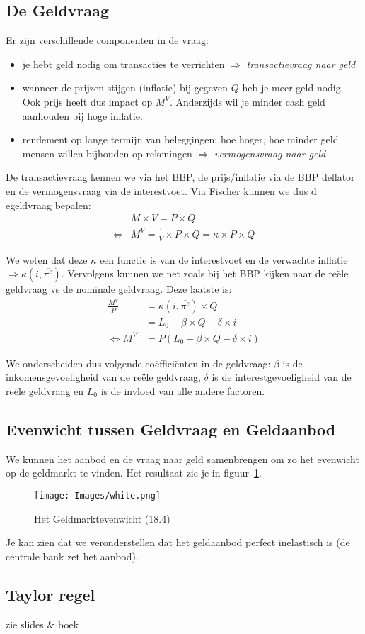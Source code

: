 \subsection{De Geldvraag}
\label{sub:De Geldvraag}
Er zijn verschillende componenten in de vraag:
\begin{itemize}
  \item je hebt geld nodig om transacties te verrichten $\Rightarrow$ \textit{transactievraag naar geld}
  \item wanneer de prijzen stijgen (inflatie) bij gegeven $Q$ heb je meer geld nodig. Ook prijs heeft dus impact op $M^V$. Anderzijds wil je minder cash geld aanhouden bij hoge inflatie.
  \item rendement op lange termijn van beleggingen: hoe hoger, hoe minder geld mensen willen bijhouden op rekeningen $\Rightarrow$ \textit{vermogensvraag naar geld}
\end{itemize}

De transactievraag kennen we via het BBP, de prijs/inflatie via de BBP deflator en de vermogensvraag via de interestvoet. Via Fischer kunnen we dus d egeldvraag bepalen:
\begin{align}
  &M \times V = P \times Q \\
  \Leftrightarrow &M^V = \frac{1}{V} \times P \times Q = \kappa \times P \times Q
\end{align}

We weten dat deze $\kappa$ een functie is van de interestvoet en de verwachte inflatie $\Rightarrow \kappa(\overline{i}, \overline{\pi^e})$. Vervolgens kunnen we net zoals bij het BBP kijken naar de re\"ele geldvraag vs de nominale geldvraag. Deze laatste is:
\begin{align}
  \frac{M^V}{P} &= \kappa(\overline{i}, \overline{\pi^e}) \times Q \\
  &= L_0 + \beta \times Q - \delta \times i \\
  \Leftrightarrow M^V &= P (L_0 + \beta \times Q - \delta \times i)
\end{align}

We onderscheiden dus volgende co\"effici\"enten in de geldvraag: $\beta$ is de inkomensgevoeligheid van de re\"ele geldvraag, $\delta$ is de interestgevoeligheid van de re\"ele geldvraag en $L_0$ is de invloed van alle andere factoren.

\subsection{Evenwicht tussen Geldvraag en Geldaanbod}
\label{sub:Evenwicht tussen Geldvraag en Geldaanbod}
We kunnen het aanbod en de vraag naar geld samenbrengen om zo het evenwicht op de geldmarkt te vinden. Het resultaat zie je in figuur~\ref{fig:geldmarktevenwicht}.
\begin{figure}[htbp]
  \centering
  \texttt{[image: Images/white.png]}
  \caption{Het Geldmarktevenwicht (18.4)}
  \label{fig:geldmarktevenwicht}
\end{figure}
Je kan zien dat we veronderstellen dat het geldaanbod perfect inelastisch is (de centrale bank zet het aanbod).

\subsection{Taylor regel}
\label{sub:Taylor regel}
zie slides & boek
